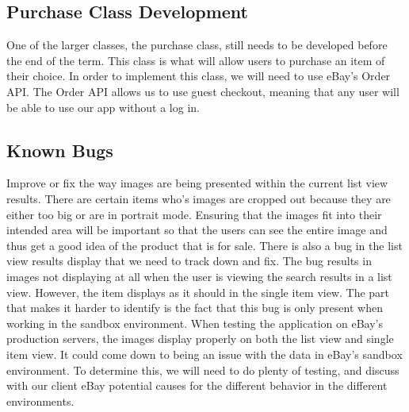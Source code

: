 \documentclass[journal,compsoc, 10pt, draftclsnofoot, onecolumn]{IEEEtran}
\begin{document}
\subsection{Purchase Class Development}
One of the larger classes, the purchase class, still needs to be developed before 
the end of the term. This class is what will allow users to purchase an item of their 
choice. In order to implement this class, we will need to use eBay's Order API. The 
Order API allows us to use guest checkout, meaning that any user will be able to 
use our app without a log in.

\subsection{Known Bugs}
Improve or fix the way images are being presented within the current list view 
results. There are certain items who's images are cropped out because they are 
either too big or are in portrait mode. Ensuring that the images fit into their 
intended area will be important so that the users can see the entire image and 
thus get a good idea of the product that is for sale. There is also a bug in 
the list view results display that we need to track down and fix. The bug 
results in images not displaying at all when the user is viewing the search 
results in a list view. However, the item displays as it should in the single 
item view. The part that makes it harder to identify is the fact that this bug 
is only present when working in the sandbox environment. When testing the 
application on eBay's production servers, the images display properly on both 
the list view and single item view. It could come down to being an issue with 
the data in eBay's sandbox environment. To determine this, we will need to do 
plenty of testing, and discuss with our client eBay potential causes for the 
different behavior in the different environments. 
\end{document}
